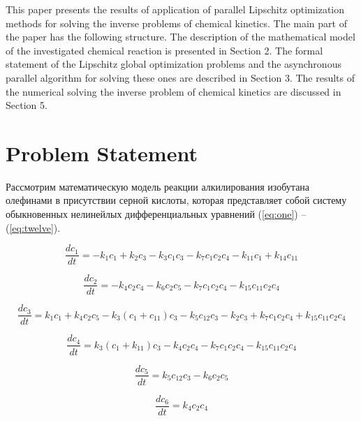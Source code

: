 \documentclass{svproc}
\begin{document}
This paper presents the results of application of parallel Lipschitz optimization methods for solving the inverse problems of chemical kinetics. The main part of the paper has the following structure. The description of the mathematical model of the investigated chemical reaction is presented in Section 2. The formal statement of the Lipschitz global optimization problems and the asynchronous parallel algorithm for solving these ones are described in Section 3. The results of the numerical solving the inverse problem of chemical kinetics are discussed in Section 5.

\section{Problem Statement}\label{Sec_math_mod}

Рассмотрим математическую модель реакции алкилирования изобутана олефинами в присутствии серной кислоты, которая представляет собой систему обыкновенных нелинейлых дифференциальных уравнений (\ref{eq:one}) -- (\ref{eq:twelve}).

\begin{equation}
  \frac{dc_1}{dt} = -k_1c_1 + k_2c_3 - k_3c_1c_3 - k_7c_1c_2c_4 - k_{11}c_1 + k_{14}c_{11}
  \label{eq:one}
\end{equation}

\begin{equation}
  \frac{dc_2}{dt} = -k_4c_2c_4 - k_6c_2c_5 - k_7c_1c_2c_4 - k_{15}c_{11}c_2c_4
  \label{eq:two}
\end{equation}

\begin{equation}
  \frac{dc_3}{dt} = k_1c_1 + k_4c_2c_5 - k_3(c_1 + c_{11})c_3 - k_{5}c_{12}c_3 - k_2c_3 + k_7c_1c_2c_4 + k_{15}c_{11}c_2c_4
  \label{eq:three}
\end{equation}

\begin{equation}
  \frac{dc_4}{dt} = k_3(c_1 + k_{11})c_3 - k_4c_2c_4 - k_{7}c_{1}c_2c_4 - k_{15}c_{11}c_2c_4
  \label{eq:four}
\end{equation}

\begin{equation}
  \frac{dc_5}{dt} = k_5c_{12}c_3 - k_{6}c_2c_5
  \label{eq:five}
\end{equation}

\begin{equation}
  \frac{dc_6}{dt} = k_4c_{2}c_4
  \label{eq:six}
\end{equation}
\end{document}
